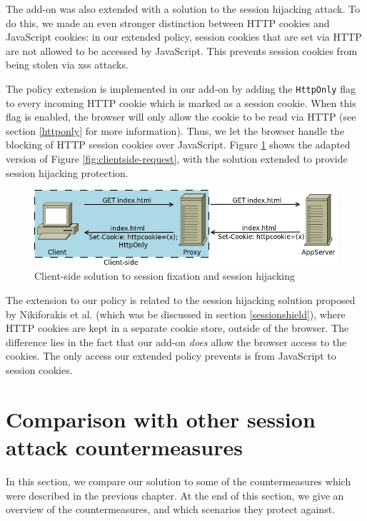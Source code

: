 The add-on was also extended with a solution to the session hijacking attack. To do this, we made an even stronger distinction between HTTP cookies and JavaScript cookies: in our extended policy, session cookies that are set via HTTP are not allowed to be accessed by JavaScript. This prevents session cookies from being stolen via \gls{xss} attacks.

The policy extension is implemented in our add-on by adding the \texttt{HttpOnly} flag to every incoming HTTP cookie which is marked as a session cookie. When this flag is enabled, the browser will only allow the cookie to be read via HTTP (see section \ref{httponly} for more information). Thus, we let the browser handle the blocking of HTTP session cookies over JavaScript. Figure \ref{fig:clientside-httponly} shows the adapted version of Figure \ref{fig:clientside-request}, with the solution extended to provide session hijacking protection.

\begin{figure}[ht]
	\centering
	\includegraphics[width=.7\textwidth]{img/clientside-proxy-3.png}
	\caption{Client-side solution to session fixation and session hijacking}
	\label{fig:clientside-httponly}
\end{figure}

The extension to our policy is related to the session hijacking solution proposed by Nikiforakis et al. \cite{Nikiforakis2010} (which was be discussed in section \ref{sessionshield}), where HTTP cookies are kept in a separate cookie store, outside of the browser. The difference lies in the fact that our add-on \emph{does} allow the browser access to the cookies. The only access our extended policy prevents is from JavaScript to session cookies.

\section{Comparison with other session attack countermeasures}\label{related-work}%

In this section, we compare our solution to some of the countermeasures which were described in the previous chapter. At the end of this section, we give an overview of the countermeasures, and which scenarios they protect against. %


